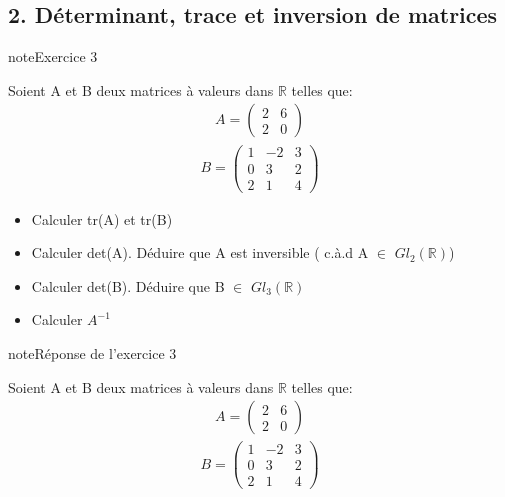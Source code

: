 \documentclass[letterpaper,10pt,french]{jupyterBook}
\begin{document}
\subsection{2. Déterminant, trace et inversion de matrices}
\label{\detokenize{S_xe9rie3:determinant-trace-et-inversion-de-matrices}}
\begin{sphinxadmonition}{note}{Exercice 3}

\sphinxAtStartPar
Soient A  et B deux matrices à valeurs dans \(\mathbb{R}\) telles que:
\begin{equation*}
\begin{split}
A = 
\begin{pmatrix}
2 & 6 \\
2 & 0 
\end{pmatrix}
\end{split}
\end{equation*}\begin{equation*}
\begin{split}
B = 
\begin{pmatrix}
1 & -2 & 3 \\
0 & 3 & 2  \\
2 & 1 & 4 
\end{pmatrix}
\end{split}
\end{equation*}\begin{itemize}
\item {} 
\sphinxAtStartPar
Calculer tr(A) et tr(B)

\item {} 
\sphinxAtStartPar
Calculer det(A). Déduire que A est inversible ( c.à.d A \(\in\) \(Gl_2(\mathbb{R})\))

\item {} 
\sphinxAtStartPar
Calculer det(B). Déduire que B \(\in\) \(Gl_3(\mathbb{R})\)

\item {} 
\sphinxAtStartPar
Calculer \(A^{-1}\)

\end{itemize}
\end{sphinxadmonition}

\begin{sphinxadmonition}{note}{Réponse de l’exercice 3}

\sphinxAtStartPar
Soient A  et B deux matrices à valeurs dans \(\mathbb{R}\) telles que:
\begin{equation*}
\begin{split}
A = 
\begin{pmatrix}
2 & 6 \\
2 & 0 
\end{pmatrix}
\end{split}
\end{equation*}\begin{equation*}
\begin{split}
B = 
\begin{pmatrix}
1 & -2 & 3 \\
0 & 3 & 2  \\
2 & 1 & 4 
\end{pmatrix}
\end{split}
\end{equation*}\end{sphinxadmonition}
\end{document}
